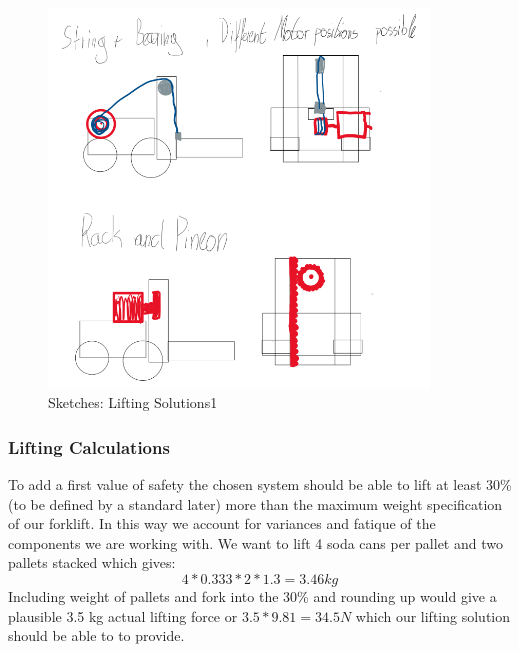 \documentclass[../report.tex]{subfiles}
\begin{document}
\begin{figure}[H]
    \centering
    \includegraphics[width=0.9\textwidth]{../image/Liftsolutions2.png}
    \caption{Sketches: Lifting Solutions1}
\end{figure}

\subsubsection{Lifting Calculations}
To add a first value of safety the chosen system should be able to lift at least 30\% (to be defined by a standard later) more than the maximum weight
specification of our forklift. In this way we account for variances and fatique of the components we are working 
with.
We want to lift 4 soda cans per pallet and two pallets stacked which gives:
\[ 4*0.333*2*1.3=3.46kg\]
Including weight of pallets and fork into the 30\% and rounding up would give a plausible 3.5 kg actual lifting force or
\(3.5*9.81=34.5N\) which our lifting solution should be able to to provide.
\end{document}
